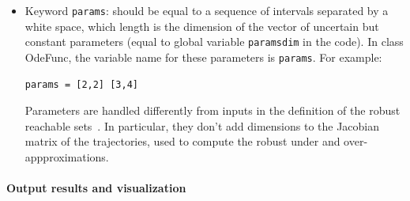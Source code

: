 \documentclass{article}
\begin{document}
\begin{itemize}
\item Keyword \texttt{params}: should be equal to  a sequence of  intervals separated by a white space,  which length is the dimension of the vector of uncertain but constant parameters (equal to global variable  \texttt{paramsdim} in the code).  In class OdeFunc, the variable name for these parameters is \texttt{params}.
For example:
\begin{verbatim}
params = [2,2] [3,4]
\end{verbatim}
Parameters are handled differently from inputs in the definition of the robust reachable sets~\cite{hscc19}.  In particular,  they don't add dimensions to the Jacobian matrix of the trajectories, used to compute the robust under and over-appproximations. 
\end{itemize}

\paragraph{Output results and visualization}
\end{document}
